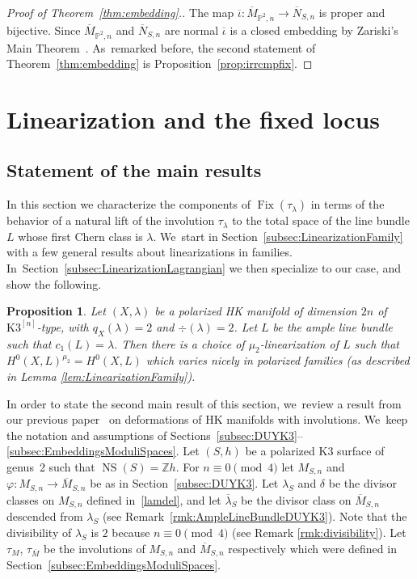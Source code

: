\documentclass[JEP,XML,SOM,Unicode,published]{cedram}
\newcommand{\HK}{\textup{HK}\xspace}
\newcommand{\PP}{{\mathbb P}}\let\P\PP
\newcommand{\ZZ}{{\mathbb Z}}\let\Z\ZZ
\DeclareMathOperator{\Fix}{Fix}
\DeclareMathOperator{\NS}{NS}
\let\ov\overline
\let\phi\varphi
\newtheorem{prop}[lemm]{Proposition}
\theoremstyle{definition}
\def\citestacks#1{\cite[\href{https://stacks.math.columbia.edu/tag/#1}{Tag #1}]{stacks-project}}
\begin{document}
\begin{proof}[Proof of Theorem~\ref{thm:embedding}.]
The map $\overline{\iota}\colon\overline{M}_{\PP^2,n}\to\overline{N}_{S,n}$ is proper and bijective.
Since $\overline{M}_{\PP^2,n}$ and $\overline{N}_{S,n}$ are normal
$\overline{\iota}$ is a closed embedding by Zariski's Main Theorem~\citestacks{03GW}. As~remarked before, the second statement of Theorem~\ref{thm:embedding} is Proposition~\ref{prop:irrcmpfix}.
\end{proof}

\section{Linearization and the fixed locus}\label{sec:linearization}

\subsection{Statement of the main results}\label{subsec:negzerofiber}

In this section we characterize the components of $\Fix(\tau_\lambda)$ in terms of the behavior of a natural lift of the involution $\tau_\lambda$ to the total space of the line bundle $L$ whose first Chern class is $\lambda$. We~start in Section~\ref{subsec:LinearizationFamily} with a few general results about linearizations in families. In~Section~\ref{subsec:LinearizationLagrangian} we then specialize to our case, and show the following.

\begin{prop}\label{prop:ChoiceLinearizationFamily}
Let $(X,\lambda)$ be a polarized \HK manifold of dimension $2n$ of $\mathrm{K3}^{[n]}$-type, with $q_X(\lambda)=2$ and $\div(\lambda)=2$. Let $L$ be the ample line bundle such that \hbox{$c_1(L)=\lambda$}.
Then there is a choice of $\mu_2$-linearization of $L$ such that $H^0(X,L)^{\mu_2} = H^0(X,L)$ which varies nicely in polarized families (as described in Lemma \ref{lem:LinearizationFamily}).
\end{prop}

In order to state the second main result of this section, we~review a result from our previous paper~\cite{involutions1} on deformations of \HK manifolds with involutions. We~keep the notation and assumptions of Sections~\ref{subsec:DUYK3}--\ref{subsec:EmbeddingsModuliSpaces}.
Let $(S,h)$ be a polarized K3 surface of genus~2 such that $\NS(S)=\ZZ h$.
For $n\equiv 0 \pmod 4$ let $M_{S,n}$ and $\phi\colon M_{S,n}\to \overline{M}_{S,n}$ be as in Section~\ref{subsec:DUYK3}. Let $\lambda_S$ and $\delta$ be the divisor classes on $M_{S,n}$ defined in~\eqref{lamdel}, and let $\overline{\lambda}{}_S$ be the divisor class on $\overline{M}_{S,n}$ descended from $\lambda_S$ (see Remark~\ref{rmk:AmpleLineBundleDUYK3}).
Note that the divisibility of $\lambda_S$ is $2$ because $n\equiv 0 \pmod 4$ (see Remark \ref{rmk:divisibility}).
Let $\tau_M$, $\tau_{\ov{M}}$ be the involutions of $M_{S,n}$ and $\overline{M}_{S,n}$ respectively which were defined in Section~\ref{subsec:EmbeddingsModuliSpaces}.
\end{document}
